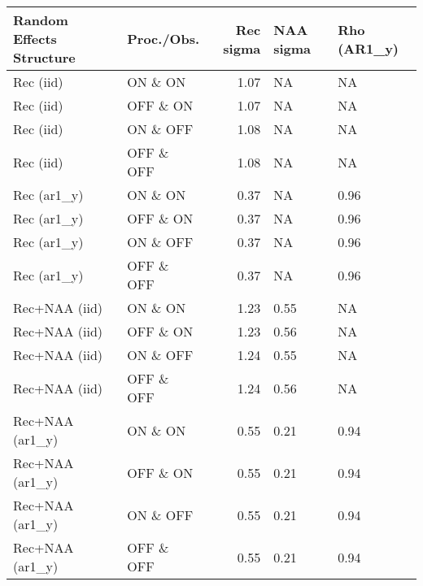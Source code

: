 \begin{table}[H]
    \centering
    \begin{tabular}{llrll}
        \toprule
        Random Effects Structure & Proc./Obs. & Rec sigma & NAA sigma & Rho (AR1\_y) \\
        \midrule
        Rec (iid)       & ON \& ON   & 1.07 & NA & NA \\
        Rec (iid)       & OFF \& ON  & 1.07 & NA & NA \\
        Rec (iid)       & ON \& OFF  & 1.08 & NA & NA \\
        Rec (iid)       & OFF \& OFF & 1.08 & NA & NA \\
        Rec (ar1\_y)    & ON \& ON   & 0.37 & NA & 0.96 \\
        Rec (ar1\_y)    & OFF \& ON  & 0.37 & NA & 0.96 \\
        Rec (ar1\_y)    & ON \& OFF  & 0.37 & NA & 0.96 \\
        Rec (ar1\_y)    & OFF \& OFF & 0.37 & NA & 0.96 \\
        Rec+NAA (iid)      & ON \& ON   & 1.23 & 0.55 & NA \\
        Rec+NAA (iid)      & OFF \& ON  & 1.23 & 0.56 & NA \\
        Rec+NAA (iid)      & ON \& OFF  & 1.24 & 0.55 & NA \\
        Rec+NAA (iid)      & OFF \& OFF & 1.24 & 0.56 & NA \\
        Rec+NAA (ar1\_y)   & ON \& ON   & 0.55 & 0.21 & 0.94 \\
        Rec+NAA (ar1\_y)   & OFF \& ON  & 0.55 & 0.21 & 0.94 \\
        Rec+NAA (ar1\_y)   & ON \& OFF  & 0.55 & 0.21 & 0.94 \\
        Rec+NAA (ar1\_y)   & OFF \& OFF & 0.55 & 0.21 & 0.94 \\
        \bottomrule
    \end{tabular}
\end{table}
